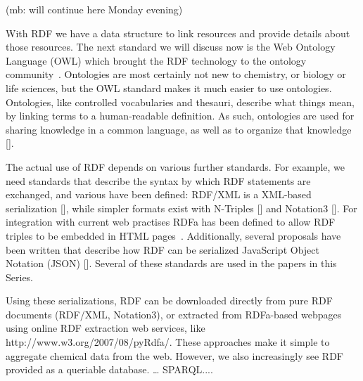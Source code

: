 \documentclass[10pt]{bmc_article}
\newenvironment{bmcformat}{\begin{raggedright}\baselineskip20pt\sloppy\setboolean{publ}{false}}{\end{raggedright}\baselineskip20pt\sloppy}
\begin{document}
\begin{bmcformat}
(mb: will continue here Monday evening)

With RDF we have a data structure to link resources and provide details about
those resources. The next standard we will discuss now is the Web Ontology
Language (OWL) which brought the RDF technology to the ontology community~\cite{GUN2004}.
Ontologies are most certainly not new to chemistry, or biology or life sciences,
but the OWL standard makes it much easier to use ontologies. Ontologies, like
controlled vocabularies and thesauri, describe what things mean, by linking
terms to a human-readable definition. As such, ontologies are used for sharing
knowledge in a common language, as well as to organize that knowledge []. 

The actual use of RDF depends on various further standards. For example, we need
standards that describe the syntax by which RDF statements are exchanged, and
various have been defined: RDF/XML is a XML-based serialization [], while
simpler formats exist with N-Triples [] and Notation3 []. For integration with
current web practises RDFa has been defined to allow RDF triples to be embedded
in HTML pages~\cite{RDFA2008}. Additionally, several proposals have been written that
describe how RDF can be serialized JavaScript Object Notation (JSON) []. Several
of these standards are used in the papers in this Series.

Using these serializations, RDF can be downloaded directly from pure RDF
documents (RDF/XML, Notation3), or extracted from RDFa-based webpages using
online RDF extraction web services, like http://www.w3.org/2007/08/pyRdfa/.
These approaches make it simple to aggregate chemical data from the web.
However, we also increasingly see RDF provided as a queriable database. …
SPARQL....



\end{bmcformat}
\end{document}
